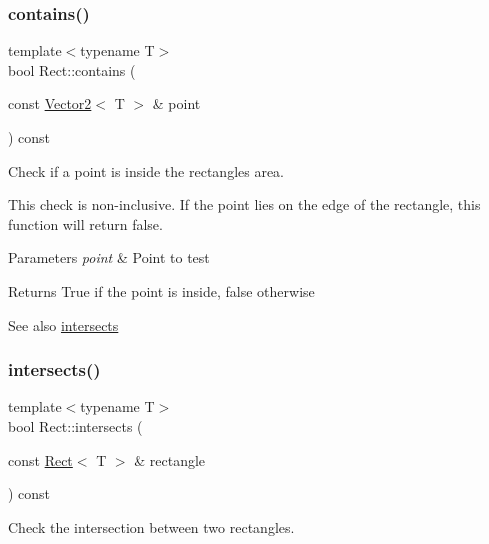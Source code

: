 \subsubsection{\texorpdfstring{contains()}{contains()}\hspace{0.1cm}{\footnotesize\ttfamily [2/2]}}
{\footnotesize\ttfamily template$<$typename T$>$ \\
bool Rect\+::contains (\begin{DoxyParamCaption}\item[{const \hyperlink{classsf_1_1_vector2}{Vector2}$<$ T $>$ \&}]{point }\end{DoxyParamCaption}) const}



Check if a point is inside the rectangle\textquotesingle{}s area. 

This check is non-\/inclusive. If the point lies on the edge of the rectangle, this function will return false.


\begin{DoxyParams}{Parameters}
{\em point} & Point to test\\
\hline
\end{DoxyParams}
\begin{DoxyReturn}{Returns}
True if the point is inside, false otherwise
\end{DoxyReturn}
\begin{DoxySeeAlso}{See also}
\hyperlink{classsf_1_1_rect_ad90321b1135cad31589f2db2f9b772db}{intersects} 
\end{DoxySeeAlso}
\mbox{\label{classsf_1_1_rect_ad90321b1135cad31589f2db2f9b772db}} 
\subsubsection{\texorpdfstring{intersects()}{intersects()}\hspace{0.1cm}{\footnotesize\ttfamily [1/2]}}
{\footnotesize\ttfamily template$<$typename T$>$ \\
bool Rect\+::intersects (\begin{DoxyParamCaption}\item[{const \hyperlink{classsf_1_1_rect}{Rect}$<$ T $>$ \&}]{rectangle }\end{DoxyParamCaption}) const}



Check the intersection between two rectangles. 


